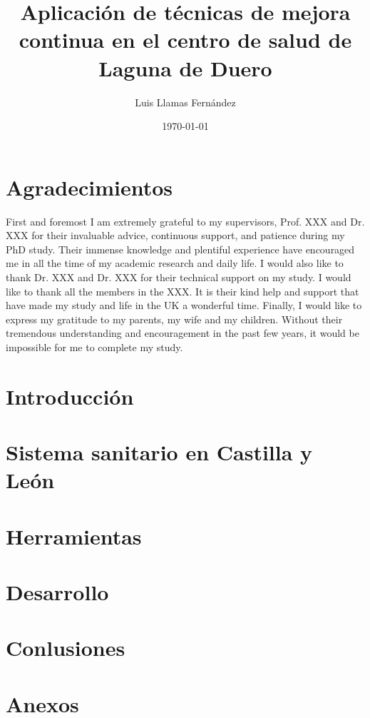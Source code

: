 \documentclass[12pt, a4paper]{report}
\begin{document}
\title{Aplicación de técnicas de mejora continua en el centro de salud de Laguna de Duero}
\author{Luis Llamas Fernández}
\date{\today}
\maketitle

\chapter*{Agradecimientos}
First and foremost I am extremely grateful to my supervisors, Prof. XXX and Dr. XXX for their invaluable advice, continuous support, and patience during my PhD study. Their immense knowledge and plentiful experience have encouraged me in all the time of my academic research and daily life. I would also like to thank Dr. XXX and Dr. XXX for their technical support on my study. I would like to thank all the members in the XXX. It is their kind help and support that have made my study and life in the UK a wonderful time. Finally, I would like to express my gratitude to my parents, my wife and my children. Without their tremendous understanding and encouragement in the past few years, it would be impossible for me to complete my study.

\tableofcontents

\chapter{Introducción}




\chapter{Sistema sanitario en Castilla y León}


\chapter{Herramientas}
\chapter{Desarrollo}
\chapter{Conlusiones}

\appendix
\chapter{Anexos}

\printbibliography
\end{document}

